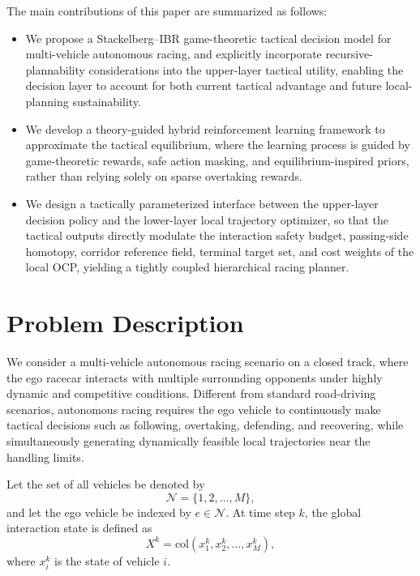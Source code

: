 \documentclass[final ,3p, times]{elsarticle}
\begin{document}
The main contributions of this paper are summarized as follows:
\begin{itemize}
    \item We propose a Stackelberg--IBR game-theoretic tactical decision model for multi-vehicle autonomous racing, and explicitly incorporate recursive-plannability considerations into the upper-layer tactical utility, enabling the decision layer to account for both current tactical advantage and future local-planning sustainability.
    \item We develop a theory-guided hybrid reinforcement learning framework to approximate the tactical equilibrium, where the learning process is guided by game-theoretic rewards, safe action masking, and equilibrium-inspired priors, rather than relying solely on sparse overtaking rewards.
    \item We design a tactically parameterized interface between the upper-layer decision policy and the lower-layer local trajectory optimizer, so that the tactical outputs directly modulate the interaction safety budget, passing-side homotopy, corridor reference field, terminal target set, and cost weights of the local OCP, yielding a tightly coupled hierarchical racing planner.
\end{itemize}


\section{Problem Description}
\label{sec:problem_description}

We consider a multi-vehicle autonomous racing scenario on a closed track, where the ego racecar interacts with multiple surrounding opponents under highly dynamic and competitive conditions. Different from standard road-driving scenarios, autonomous racing requires the ego vehicle to continuously make tactical decisions such as following, overtaking, defending, and recovering, while simultaneously generating dynamically feasible local trajectories near the handling limits.

Let the set of all vehicles be denoted by
\begin{equation}
\mathcal{N}=\{1,2,\dots,M\},
\label{eq:vehicle_set}
\end{equation}
and let the ego vehicle be indexed by $e \in \mathcal{N}$. At time step $k$, the global interaction state is defined as
\begin{equation}
X^k = \mathrm{col}(x_1^k,x_2^k,\dots,x_M^k),
\label{eq:global_interaction_state}
\end{equation}
where $x_i^k$ is the state of vehicle $i$.
\end{document}
